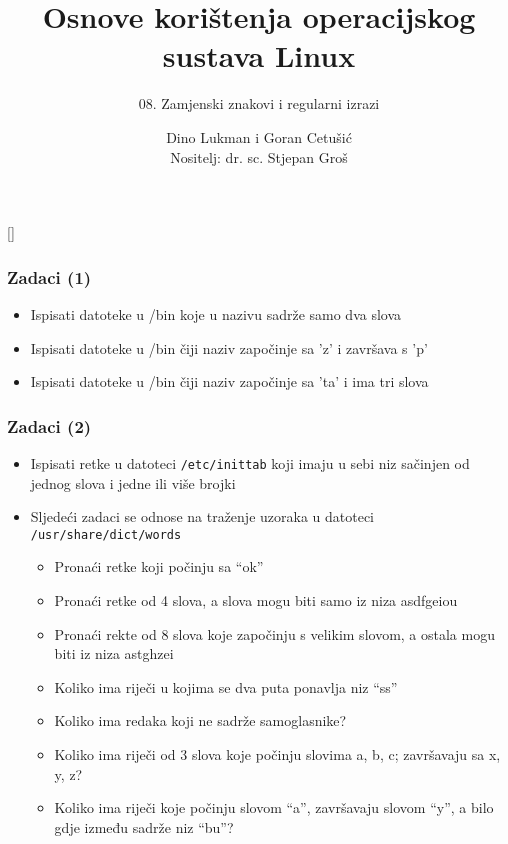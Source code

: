 \documentclass[table,usenames,dvipsnames]{beamer}
\title{Osnove korištenja operacijskog sustava Linux}
\subtitle{08. Zamjenski znakovi i regularni izrazi}
\author[Dino Lukman i Goran Cetušić]{Dino Lukman i Goran Cetušić\\{\small Nositelj: dr. sc. Stjepan Groš}}
\institute[FER]{Sveučilište u Zagrebu \\
				Fakultet elektrotehnike i računarstva}
\date{\todayiso}
\newcommand{\shell}[1]{\texttt{#1}}
\begin{document}
{
[] %

\begin{frame}
\maketitle
\end{frame}
}

\begin{frame}[t]
\frametitle{Zadaci (1)}
\begin{itemize}
  \item Ispisati datoteke u /bin koje u nazivu sadrže samo dva slova
  \item Ispisati datoteke u /bin čiji naziv započinje sa 'z' i završava s 'p'
  \item Ispisati datoteke u /bin čiji naziv započinje sa 'ta' i ima tri slova
\end{itemize}
\end{frame}

\begin{frame}[t]
\frametitle{Zadaci (2)}
\begin{itemize}
  \item Ispisati retke u datoteci \shell{/etc/inittab} koji imaju u sebi 
        niz sačinjen od jednog slova i jedne ili više brojki
  \item Sljedeći zadaci se odnose na traženje uzoraka u datoteci 
        \shell{/usr/share/dict/words}
  \begin{itemize}
    \item Pronaći retke koji počinju sa ``ok''
    \item Pronaći retke od 4 slova, a slova mogu biti samo iz niza asdfgeiou
    \item Pronaći rekte od 8 slova koje započinju s velikim slovom, a ostala mogu biti iz niza astghzei
    \item Koliko ima riječi u kojima se dva puta ponavlja niz ``ss''
    \item Koliko ima redaka koji ne sadrže samoglasnike?
    \item Koliko ima riječi od 3 slova koje počinju slovima a, b, c; 
        završavaju sa x, y, z?
    \item Koliko ima riječi koje počinju slovom ``a'', završavaju slovom 
        ``y'', a bilo gdje između sadrže niz ``bu''?
  \end{itemize}
\end{itemize}
\end{frame}
\end{document}
